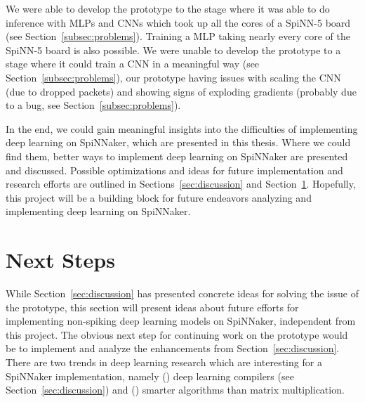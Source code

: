 \documentclass[]{article}
\begin{document}
We were able to develop the prototype to the stage where it was able
to do inference with MLPs and CNNs which took up all the cores of a
SpiNN-5 board (see Section~\ref{subsec:problems}).
Training a MLP taking nearly every core of the SpiNN-5 board is also
possible.
We were unable to develop the prototype to a stage where it could
train a CNN in a meaningful way (see Section~\ref{subsec:problems}),
our prototype having issues with scaling the CNN (due to dropped
packets) and showing signs of exploding gradients (probably due to
a bug, see Section~\ref{subsec:problems}).

In the end, we could gain meaningful insights into the difficulties of
implementing deep learning on SpiNNaker, which are presented in this
thesis.
Where we could find them, better ways to implement deep learning on
SpiNNaker are presented and discussed.
Possible optimizations and ideas for future implementation and
research efforts are outlined in Sections~\ref{sec:discussion} and
Section~\ref{sec:next_steps}.
Hopefully, this project will be a building block for future endeavors
analyzing and implementing deep learning on SpiNNaker.




\section{Next Steps} %
\label{sec:next_steps}

While Section~\ref{sec:discussion} has presented concrete ideas for
solving the issue of the prototype, this section will present ideas
about future efforts for implementing non-spiking deep learning models
on SpiNNaker, independent from this project.
The obvious next step for continuing work on the prototype would be
to implement and analyze the enhancements from
Section~\ref{sec:discussion}.
There are two trends in deep learning research which are interesting
for a SpiNNaker implementation, namely () deep learning
compilers (see Section~\ref{sec:discussion}) and ()
smarter algorithms than matrix multiplication.
\end{document}
